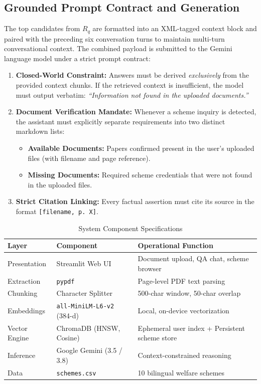\documentclass[conference]{IEEEtran}
\begin{document}
\subsection{Grounded Prompt Contract and Generation}
The top candidates from $R_q$ are formatted into an XML-tagged context block and paired with the preceding six conversation turns to maintain multi-turn conversational context. The combined payload is submitted to the Gemini language model under a strict prompt contract:
\begin{enumerate}
    \item \textbf{Closed-World Constraint:} Answers must be derived \textit{exclusively} from the provided context chunks. If the retrieved context is insufficient, the model must output verbatim: \textit{``Information not found in the uploaded documents.''}
    \item \textbf{Document Verification Mandate:} Whenever a scheme inquiry is detected, the assistant must explicitly separate requirements into two distinct markdown lists:
    \begin{itemize}
        \item \textbf{Available Documents:} Papers confirmed present in the user's uploaded files (with filename and page reference).
        \item \textbf{Missing Documents:} Required scheme credentials that were not found in the uploaded files.
    \end{itemize}
    \item \textbf{Strict Citation Linking:} Every factual assertion must cite its source in the format \texttt{[filename, p. X]}.
\end{enumerate}

\begin{table}[t]
\caption{System Component Specifications}
\label{tab:stack}
\centering
\small
\begin{tabular}{p{2.2cm}p{3.2cm}p{2.4cm}}
\hline
\textbf{Layer} & \textbf{Component} & \textbf{Operational Function}\\
\hline
Presentation & Streamlit Web UI & Document upload, QA chat, scheme browser\\
Extraction & \texttt{pypdf} & Page-level PDF text parsing\\
Chunking & Character Splitter & 500-char window, 50-char overlap\\
Embeddings & \texttt{all-MiniLM-L6-v2} (384-d) & Local, on-device vectorization\\
Vector Engine & ChromaDB (HNSW, Cosine) & Ephemeral user index + Persistent scheme store\\
Inference & Google Gemini (3.5 / 3.8) & Context-constrained reasoning\\
Data & \texttt{schemes.csv} & 10 bilingual welfare schemes\\
\hline
\end{tabular}
\end{table}
\end{document}
